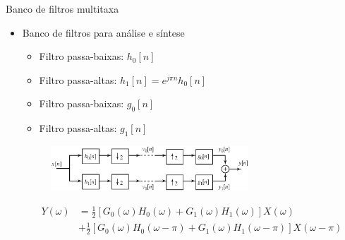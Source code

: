 \documentclass[
size=11pt,
paper=screen,
mode=present,
display=slidesnotes,
style=paintings,
nopagebreaks,
blackslide,
fleqn]{powerdot}
\begin{document}
\begin{slide}{Banco de filtros multitaxa}
	\begin{itemize}
		\item Banco de filtros para análise e síntese
			\begin{itemize}
				\item Filtro passa-baixas: $h_0[n]$
				\item Filtro passa-altas: $h_1[n] = e^{j\pi n}h_0[n]$
				\item Filtro passa-baixas: $g_0[n]$
				\item Filtro passa-altas: $g_1[n]$
			\end{itemize}
                        \begin{figure}
				\centering
				\includegraphics[width=0.7\textwidth]{figs/4-44.eps}
			\end{figure}
			\begin{align*}
				Y(\omega) &= \frac{1}{2}\left [ G_0(\omega)H_0(\omega)+G_1(\omega)H_1(\omega)\right ] X(\omega)\\
				          &+\frac{1}{2} \left [ G_0(\omega)H_0(\omega-\pi)+G_1(\omega)H_1(\omega-\pi)\right ] X(\omega-\pi)
					  \end{align*}

	\end{itemize}
\end{slide}
\end{document}
